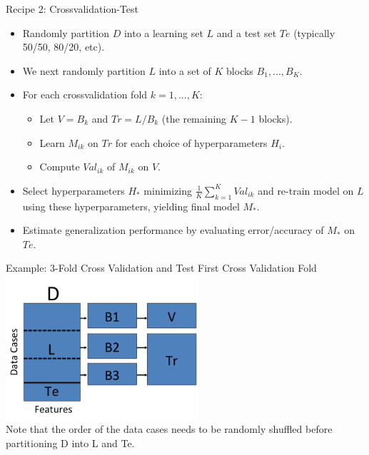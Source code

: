 \documentclass[serif,xcolor=pdftex,dvipsnames,table,hyperref={bookmarks=false}]{beamer}
\begin{document}
\begin{frame}[t]{Recipe 2: Crossvalidation-Test}
\begin{itemize}
\setlength{\itemsep}{6pt}

\item Randomly partition $D$ into a learning set $L$ and a test set $Te$ (typically 50/50, 80/20,  etc). 

\pause\item We next randomly partition $L$ into a set of $K$ blocks $B_1,...,B_K$.

\pause \item For each crossvalidation fold $k=1,...,K$:
\begin{itemize}
  \pause\item Let $V=B_k$ and $Tr = L/B_k$ (the remaining  $K-1$ blocks).
  \pause\item Learn $M_{ik}$ on $Tr$ for each choice of hyperparameters $H_i$.
  \pause\item Compute $Val_{ik}$ of $M_{ik}$ on $V$.
\end{itemize}
\pause\item Select hyperparameters $H_*$ minimizing $\frac{1}{K}\sum_{k=1}^K Val_{ik}$ and re-train model on $L$ using these hyperparameters, yielding final model $M_*$.

\pause\item Estimate generalization performance by evaluating error/accuracy of $M_*$ on $Te$.

\end{itemize}

\end{frame}

\begin{frame}[t]{Example: 3-Fold Cross Validation and Test}
\center
First Cross Validation Fold\\
\includegraphics[width=2.8in]{../Figures/model-selection-cv-te-1.png}\\
Note that the order of the data cases needs to be randomly
shuffled before partitioning D into L and Te. 
\end{frame}
\end{document}
